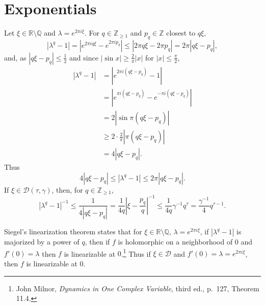 \documentclass{article}
\theoremstyle{definition}
\begin{document}
\section{Exponentials}
Let $\xi \in \mathbb{R} \setminus \mathbb{Q}$ and $\lambda = e^{2\pi i\xi}$. For $q \in \mathbb{Z}_{\geq 1}$ and 
$p_q \in \mathbb{Z}$ closest to $q\xi$, 
\[
|\lambda^q-1| = |e^{2\pi iq\xi}-e^{2\pi ip_q}| \leq |2\pi q\xi - 2\pi p_q| = 2\pi |q\xi-p_q|,
\]
and, as $|q\xi-p_q| \leq \frac{1}{2}$ and since
$|\sin x| \geq \frac{2}{\pi}|x|$ for $|x| \leq \frac{\pi}{2}$,
\begin{align*}
|\lambda^q-1| &= |e^{2\pi i(q\xi-p_q)}-1|\\
&= |e^{\pi i(q\xi-p_q)}-e^{-\pi i(q\xi-p_q)}|\\
&= 2 |\sin \pi (q\xi-p_q)|\\
&\geq 2 \cdot \frac{2}{\pi} |\pi(q\xi-p_q)|\\
&=4|q\xi-p_q|.
\end{align*}
Thus
\[
4|q\xi-p_q| \leq |\lambda^q-1| \leq 2\pi |q\xi-p_q|.
\]
If $\xi \in \mathcal{D}(\tau,\gamma)$, then, for $q \in \mathbb{Z}_{\geq 1}$,
\[
|\lambda^q-1|^{-1} \leq  \frac{1}{4|q\xi-p_q|} 
=\frac{1}{4q} \left|\xi-\frac{p_q}{q}\right|^{-1}
\leq \frac{1}{4q} \gamma^{-1} q^\tau
=\frac{\gamma^{-1}}{4} q^{\tau-1}.
\]

Siegel's linearization theorem states that for
$\xi \in \mathbb{R} \setminus \mathbb{Q}$, $\lambda=e^{2\pi i\xi}$, 
if $|\lambda^q-1|$ is majorized by a power of $q$, then
if $f$ is holomorphic on a neighborhood of $0$ and $f'(0)=\lambda$ then
$f$ is linearizable at $0$.\footnote{John Milnor, {\em Dynamics in One Complex Variable},
third ed., p.~127, Theorem 11.4.}
Thus if $\xi \in \mathcal{D}$ and $f'(0)=\lambda=e^{2\pi i\xi}$, then $f$ is linearizable at $0$.
\end{document}
